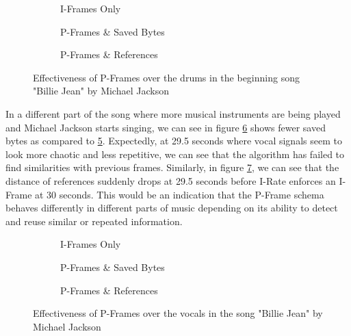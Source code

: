 \begin{figure}[ht]
\centering
\begin{subfigure}{0.30\textwidth}
    
    \caption{I-Frames Only}
    \label{fig:unmodified_25sec}
\end{subfigure}
\hfill
\begin{subfigure}{0.32\textwidth}
    
    \caption{P-Frames \& Saved Bytes}
    \label{fig:saved_25sec}
\end{subfigure}
\hfill
\begin{subfigure}{0.32\textwidth}
    
    \caption{P-Frames \& References}
    \label{fig:ref_25sec}
\end{subfigure}
\caption{Effectiveness of P-Frames over the drums in the beginning song "Billie Jean" by Michael Jackson}
\label{fig:billie_jean_25sec}
\end{figure}

In a different part of the song where more musical instruments are being played and Michael Jackson starts singing, we can see in figure \ref{fig:saved_3sec} shows fewer saved bytes as compared to \ref{fig:unmodified_3sec}. Expectedly, at 29.5 seconds where vocal signals seem to look more chaotic and less repetitive, we can see that the algorithm has failed to find similarities with previous frames. Similarly, in figure \ref{fig:ref_3sec}, we can see that the distance of references suddenly drops at 29.5 seconds before I-Rate enforces an I-Frame at 30 seconds. This would be an indication that the P-Frame schema behaves differently in different parts of music depending on its ability to detect and reuse similar or repeated information.

\begin{figure}[ht]
\centering
\begin{subfigure}{0.30\textwidth}
    
    \caption{I-Frames Only}
    \label{fig:unmodified_3sec}
\end{subfigure}
\hfill
\begin{subfigure}{0.32\textwidth}
    
    \caption{P-Frames \& Saved Bytes}
    \label{fig:saved_3sec}
\end{subfigure}
\hfill
\begin{subfigure}{0.32\textwidth}
    
    \caption{P-Frames \& References}
    \label{fig:ref_3sec}
\end{subfigure}
\caption{Effectiveness of P-Frames over the vocals in the song "Billie Jean" by Michael Jackson}
\label{fig:billie_jean_3sec}
\end{figure}

